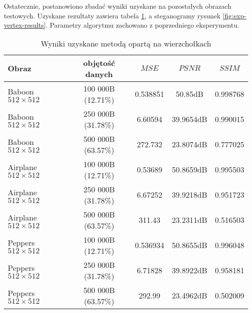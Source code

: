 {{{            %
            Ostatecznie, postanowiono zbadać wyniki uzyskane na pozostałych obrazach testowych. Uzyskane rezultaty
            zawiera tabela \ref{tab:exp-vertex-results}, a steganogramy rysunek \ref{fig:exp-vertex-results}. Parametry
            algorytmu zachowano z poprzedniego eksperymentu.

            \begin{table}
                \centering
                \caption{Wyniki uzyskane metodą opartą na wierzchołkach}
                \begin{tabular}{ |l|c|c c c| }
                    \hline
                    Obraz & objętość danych & $MSE$ & $PSNR$ & $SSIM$ \\
                    \hline
                    Baboon {\footnotesize $512 \times 512$}   & 100 000B (12.71\%) & 0.538851 & 50.85dB & 0.998768 \\
                    Baboon {\footnotesize $512 \times 512$}   & 250 000B (31.78\%) & 6.60594 & 39.9654dB & 0.990015 \\
                    Baboon {\footnotesize $512 \times 512$}   & 500 000B (63.57\%) & 272.732 & 23.8074dB & 0.777025 \\
                    Airplane {\footnotesize $512 \times 512$} & 100 000B (12.71\%) & 0.53689 & 50.8659dB & 0.995503 \\
                    Airplane {\footnotesize $512 \times 512$} & 250 000B (31.78\%) & 6.67252 & 39.9218dB & 0.951723 \\
                    Airplane {\footnotesize $512 \times 512$} & 500 000B (63.57\%) & 311.43 & 23.2311dB & 0.516503 \\
                    Peppers {\footnotesize $512 \times 512$}  & 100 000B (12.71\%) & 0.536934 & 50.8655dB & 0.996048 \\
                    Peppers {\footnotesize $512 \times 512$}  & 250 000B (31.78\%) & 6.71828 & 39.8922dB & 0.958181 \\
                    Peppers {\footnotesize $512 \times 512$}  & 500 000B (63.57\%) & 292.99 & 23.4962dB & 0.502009 \\
                    \hline
                \end{tabular}
                \label{tab:exp-vertex-results}
            \end{table}

}}}
